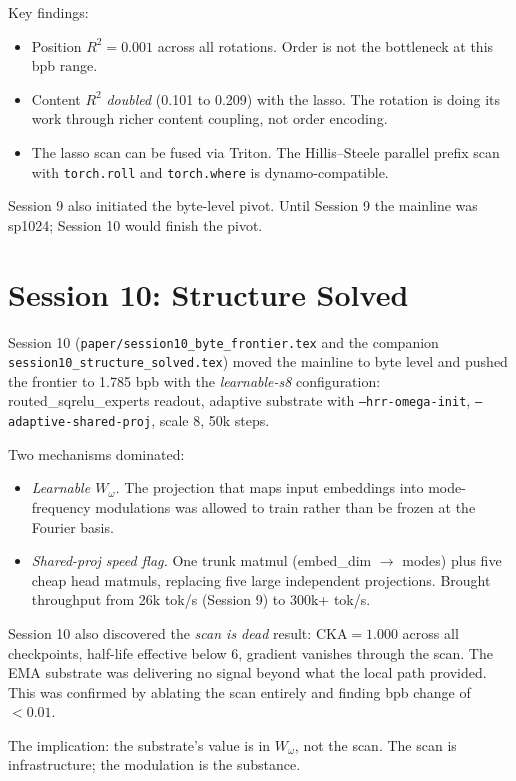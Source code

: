 \documentclass[11pt,openany]{book}
\theoremstyle{definition}
\theoremstyle{plain}
\newcommand{\cka}{\mathrm{CKA}}
\newcommand{\omegaproj}{W_\omega}
\begin{document}
Key findings:
\begin{itemize}
  \item Position $R^2 = 0.001$ across all rotations. Order is not the
    bottleneck at this bpb range.
  \item Content $R^2$ \emph{doubled} (0.101 to 0.209) with the lasso.
    The rotation is doing its work through richer content coupling,
    not order encoding.
  \item The lasso scan can be fused via Triton. The Hillis--Steele
    parallel prefix scan with \texttt{torch.roll} and \texttt{torch.where}
    is dynamo-compatible.
\end{itemize}

Session 9 also initiated the byte-level pivot. Until Session 9 the
mainline was sp1024; Session 10 would finish the pivot.

\chapter{Session 10: Structure Solved}
\label{ch:session10}

Session 10 (\texttt{paper/session10\_byte\_frontier.tex} and the companion
\texttt{session10\_structure\_solved.tex}) moved the mainline to byte level
and pushed the frontier to 1.785 bpb with the \emph{learnable-s8}
configuration: routed\_sqrelu\_experts readout, adaptive substrate with
\texttt{--hrr-omega-init}, \texttt{--adaptive-shared-proj}, scale 8, 50k
steps.

Two mechanisms dominated:
\begin{itemize}
  \item \emph{Learnable $\omegaproj$.} The projection that maps input
    embeddings into mode-frequency modulations was allowed to train
    rather than be frozen at the Fourier basis.
  \item \emph{Shared-proj speed flag.} One trunk matmul
    (embed\_dim $\to$ modes) plus five cheap head matmuls, replacing
    five large independent projections. Brought throughput from 26k
    tok/s (Session 9) to 300k+ tok/s.
\end{itemize}

Session 10 also discovered the \emph{scan is dead} result: $\cka = 1.000$
across all checkpoints, half-life effective below 6, gradient vanishes
through the scan. The EMA substrate was delivering no signal beyond what
the local path provided. This was confirmed by ablating the scan entirely
and finding bpb change of $< 0.01$.

The implication: the substrate's value is in $\omegaproj$, not the scan.
The scan is infrastructure; the modulation is the substance.
\end{document}
